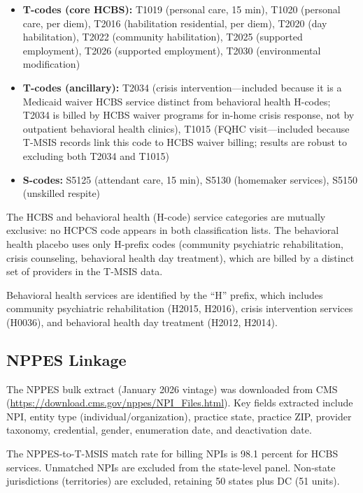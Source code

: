 \documentclass[12pt]{article}
\begin{document}
\begin{itemize}
\item \textbf{T-codes (core HCBS):} T1019 (personal care, 15 min), T1020 (personal care, per diem), T2016 (habilitation residential, per diem), T2020 (day habilitation), T2022 (community habilitation), T2025 (supported employment), T2026 (supported employment), T2030 (environmental modification)
\item \textbf{T-codes (ancillary):} T2034 (crisis intervention---included because it is a Medicaid waiver HCBS service distinct from behavioral health H-codes; T2034 is billed by HCBS waiver programs for in-home crisis response, not by outpatient behavioral health clinics), T1015 (FQHC visit---included because T-MSIS records link this code to HCBS waiver billing; results are robust to excluding both T2034 and T1015)
\item \textbf{S-codes:} S5125 (attendant care, 15 min), S5130 (homemaker services), S5150 (unskilled respite)
\end{itemize}

\noindent The HCBS and behavioral health (H-code) service categories are mutually exclusive: no HCPCS code appears in both classification lists. The behavioral health placebo uses only H-prefix codes (community psychiatric rehabilitation, crisis counseling, behavioral health day treatment), which are billed by a distinct set of providers in the T-MSIS data.

Behavioral health services are identified by the ``H'' prefix, which includes community psychiatric rehabilitation (H2015, H2016), crisis intervention services (H0036), and behavioral health day treatment (H2012, H2014).

\subsection{NPPES Linkage}

The NPPES bulk extract (January 2026 vintage) was downloaded from CMS (\url{https://download.cms.gov/nppes/NPI_Files.html}). Key fields extracted include NPI, entity type (individual/organization), practice state, practice ZIP, provider taxonomy, credential, gender, enumeration date, and deactivation date.

The NPPES-to-T-MSIS match rate for billing NPIs is 98.1 percent for HCBS services. Unmatched NPIs are excluded from the state-level panel. Non-state jurisdictions (territories) are excluded, retaining 50 states plus DC (51 units).
\end{document}
